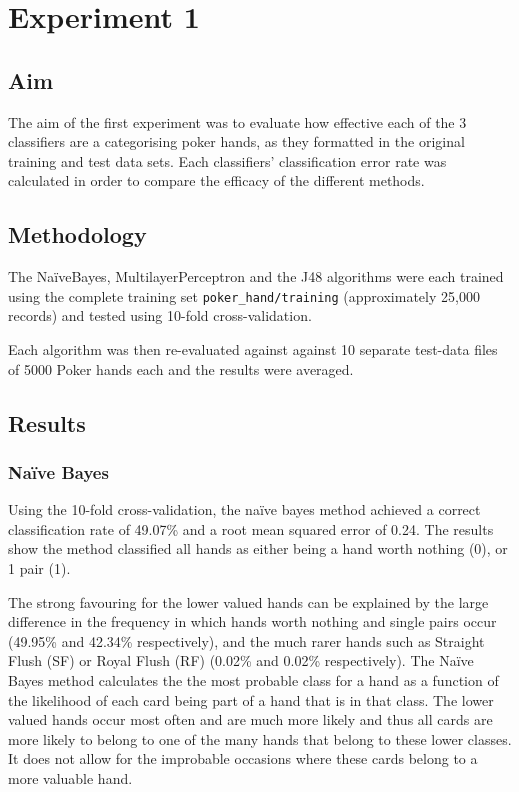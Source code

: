 \documentclass[11pt, a4paper]{article}
\begin{document}
\section*{Experiment 1}

\subsection*{Aim}

The aim of the first experiment was to evaluate how effective each of the 3 classifiers are a categorising poker hands, as they formatted in the original training and test data sets. Each classifiers' classification error rate was calculated in order to compare the efficacy of the different methods.

\subsection*{Methodology}

The Na\"iveBayes, MultilayerPerceptron and the J48 algorithms were each trained using the complete training set \texttt{poker\_hand/training} (approximately 25,000 records) and tested using 10-fold cross-validation.

Each algorithm was then re-evaluated against against 10 separate test-data files of 5000 Poker hands each and the results were averaged. 

\subsection*{Results}

\subsubsection*{Na\"ive Bayes}

Using the 10-fold cross-validation, the na\"ive bayes method achieved a correct classification rate of 49.07\% and a root mean squared error of 0.24. The results show the method classified all hands as either being a hand worth nothing (0), or 1 pair (1). 

The strong favouring for the lower valued hands can be explained by the large difference in the frequency in which hands worth nothing and single pairs occur (49.95\% and 42.34\% respectively), and the much rarer hands such as Straight Flush (SF) or Royal Flush (RF) (0.02\% and 0.02\% respectively). The Na\"ive Bayes method calculates the the most probable class for a hand as a function of the likelihood of each card being part of a hand that is in that class. The lower valued hands occur most often and are much more likely and thus all cards are more likely to belong to one of the many hands that belong to these lower classes. It does not allow for the improbable occasions where these cards belong to a more valuable hand.
\end{document}
